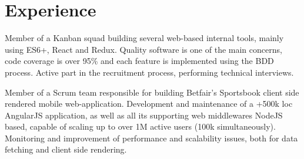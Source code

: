 \documentclass[]{andre-vechina-resume}
\begin{document}
\lastupdated




\section{Experience}

\vspace{\topsep} %
\begin{tightemize}
\item
Member of a Kanban squad building several web-based internal tools, mainly using ES6+, React and Redux.
Quality software is one of the main concerns, code coverage is over 95\% and each feature is implemented using the BDD process.
Active part in the recruitment process, performing technical interviews.
\item
Member of a Scrum team responsible for building Betfair's Sportsbook client side rendered mobile web-application.
Development and maintenance of a +500k loc AngularJS application, as well as all its supporting web middlewares NodeJS based, capable of scaling up to over 1M active users (100k simultaneously).
Monitoring and improvement of performance and scalability issues, both for data fetching and client side rendering.
\end{tightemize}
\vspace{\topsep} %
\sectionsep
\end{document}
